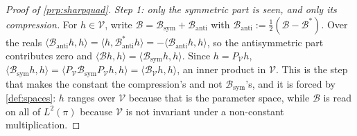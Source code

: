 \begin{proof}[Proof of \cref{prp:sharpquad}]
\emph{Step 1: only the symmetric part is seen, and only its compression.} For $h\in\mathcal V$, write
$\mathcal B=\mathcal B_{\mathrm{sym}}+\mathcal B_{\mathrm{anti}}$ with
$\mathcal B_{\mathrm{anti}}:=\tfrac12(\mathcal B-\mathcal B^{\ast})$. Over the reals
$\langle\mathcal B_{\mathrm{anti}}h,h\rangle=\langle h,\mathcal B_{\mathrm{anti}}^{\ast}h\rangle
=-\langle\mathcal B_{\mathrm{anti}}h,h\rangle$, so the antisymmetric part contributes zero and
$\langle\mathcal Bh,h\rangle=\langle\mathcal B_{\mathrm{sym}}h,h\rangle$. Since $h=P_{\mathcal V}h$,
$\langle\mathcal B_{\mathrm{sym}}h,h\rangle
=\langle P_{\mathcal V}\mathcal B_{\mathrm{sym}}P_{\mathcal V}h,h\rangle
=\langle\mathcal B_{\mathcal V}h,h\rangle$, an inner product in $\mathcal V$. This is the step that
makes the constant the compression's and not $\mathcal B_{\mathrm{sym}}$'s, and it is forced by
\cref{def:spaces}: $h$ ranges over $\mathcal V$ because that is the parameter space, while
$\mathcal B$ is read on all of $L^{2}(\pi)$ because $\mathcal V$ is not invariant under a non-constant
multiplication.


\end{proof}
